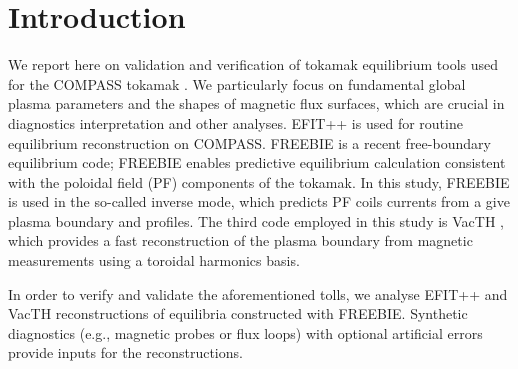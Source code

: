 
\section{Introduction} %
\label{sec:introduction}

We report here on validation and verification of tokamak equilibrium tools used for the COMPASS tokamak \cite{compass2006}. We particularly focus on fundamental global plasma parameters and the shapes of magnetic flux surfaces, which are crucial in diagnostics interpretation and other analyses. 
EFIT++ \cite{efitpp2006} is used for routine equilibrium reconstruction on COMPASS. FREEBIE \cite{freebie2012} is a recent free-boundary equilibrium code; FREEBIE enables predictive equilibrium calculation consistent with the poloidal field (PF) components of the tokamak. In this study, FREEBIE is used in the so-called inverse mode, which predicts PF coils currents from a give plasma boundary and profiles. The third code employed in this study is VacTH \cite{vacthref}, which provides a fast reconstruction of the plasma boundary from magnetic measurements using a toroidal harmonics basis.

In order to verify and validate the aforementioned tolls, we analyse EFIT++ and VacTH reconstructions of equilibria constructed with FREEBIE. Synthetic diagnostics (e.g., magnetic probes or flux loops) with optional artificial errors provide inputs for the reconstructions. 

